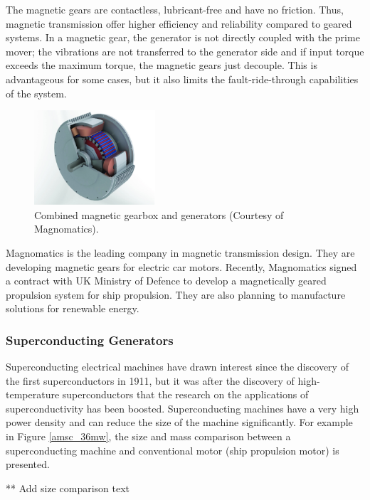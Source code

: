 \documentclass[a4paper, 11pt]{article} %
\begin{document}
The magnetic gears are contactless, lubricant-free and have no friction. Thus, magnetic transmission offer higher efficiency and reliability compared to geared systems. In a magnetic gear, the generator is not directly coupled with the prime mover; the vibrations are not transferred to the generator side and if input torque exceeds the maximum torque, the magnetic gears just decouple. This is advantageous for some cases, but it also limits the fault-ride-through capabilities of the system.

  \begin{figure}[t]
    \centering
    \includegraphics[width=0.4\textwidth]{magnomatics}
    \caption{Combined magnetic gearbox and generators (Courtesy of Magnomatics).} 
    \label{magnomatics}
  \end{figure}


Magnomatics is the leading company in magnetic transmission design. They are developing magnetic gears for electric car motors. Recently, Magnomatics signed a contract with UK Ministry of Defence to develop a magnetically geared propulsion system for ship propulsion. They are also planning to manufacture solutions for renewable energy. 

\subsubsection{Superconducting Generators}

Superconducting electrical machines have drawn interest since the discovery of the first superconductors in 1911, but it was after the discovery of high-temperature superconductors that the research on the applications of superconductivity has been boosted. Superconducting machines have a very high power density and can reduce the size of the machine significantly. For example in Figure \ref{amsc_36mw}, the size and mass comparison between a superconducting machine and conventional motor (ship propulsion motor) is presented.


** Add size comparison text
\end{document}
